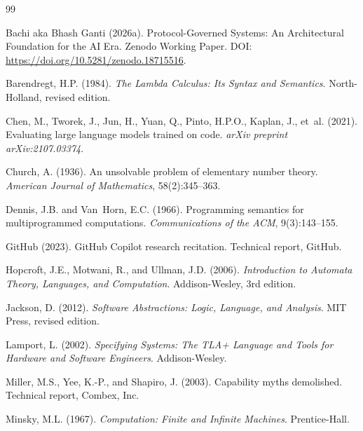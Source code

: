\documentclass[11pt,a4paper]{article}
\begin{document}


\begin{thebibliography}{99}

Bachi aka Bhash Ganti (2026a).
\newblock Protocol-Governed Systems: An Architectural Foundation for the AI Era.
\newblock Zenodo Working Paper.
\newblock DOI: \url{https://doi.org/10.5281/zenodo.18715516}.

Barendregt, H.P. (1984).
\newblock \emph{The Lambda Calculus: Its Syntax and Semantics}.
\newblock North-Holland, revised edition.

Chen, M., Tworek, J., Jun, H., Yuan, Q., Pinto, H.P.O., Kaplan, J., et~al. (2021).
\newblock Evaluating large language models trained on code.
\newblock \emph{arXiv preprint arXiv:2107.03374}.

Church, A. (1936).
\newblock An unsolvable problem of elementary number theory.
\newblock \emph{American Journal of Mathematics}, 58(2):345--363.

Dennis, J.B. and Van~Horn, E.C. (1966).
\newblock Programming semantics for multiprogrammed computations.
\newblock \emph{Communications of the ACM}, 9(3):143--155.

GitHub (2023).
\newblock GitHub Copilot research recitation.
\newblock Technical report, GitHub.

Hopcroft, J.E., Motwani, R., and Ullman, J.D. (2006).
\newblock \emph{Introduction to Automata Theory, Languages, and Computation}.
\newblock Addison-Wesley, 3rd edition.

Jackson, D. (2012).
\newblock \emph{Software Abstractions: Logic, Language, and Analysis}.
\newblock MIT Press, revised edition.

Lamport, L. (2002).
\newblock \emph{Specifying Systems: The TLA+ Language and Tools for Hardware and Software Engineers}.
\newblock Addison-Wesley.

Miller, M.S., Yee, K.-P., and Shapiro, J. (2003).
\newblock Capability myths demolished.
\newblock Technical report, Combex, Inc.

Minsky, M.L. (1967).
\newblock \emph{Computation: Finite and Infinite Machines}.
\newblock Prentice-Hall.


\end{thebibliography}
\end{document}
